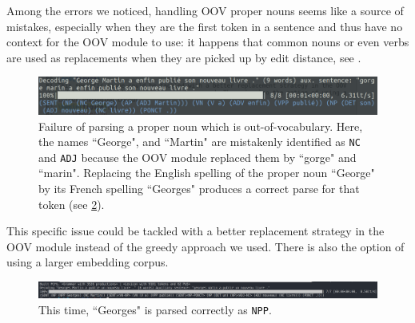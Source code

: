 \documentclass[11pt]{article}
\begin{document}
Among the errors we noticed, handling OOV proper nouns seems like a source of mistakes, especially when they are the first token in a sentence and thus have no context for the OOV module to use: it happens that common nouns or even verbs are used as replacements when they are picked up by edit distance, see .
\begin{figure}[ht!]
	\centering
	\includegraphics[width=\linewidth]{georgemartin-fail.png}
	\caption{Failure of parsing a proper noun which is out-of-vocabulary. Here, the names ``George", and ``Martin" are mistakenly identified as \lstinline|NC| and \lstinline|ADJ| because the OOV module replaced them by ``gorge" and ``marin". Replacing the English spelling of the proper noun ``George" by its French spelling ``Georges" produces a correct parse for that token (see \cref{fig:ParseWin_GeorgeRR}).}
	\label{fig:npParseFailure_GeorgeRR}
\end{figure}
This specific issue could be tackled with a better replacement strategy in the OOV module instead of the greedy approach we used. There is also the option of using a larger embedding corpus.
\begin{figure}[h]
	\centering
	\includegraphics[width=\linewidth]{../example-run.png}
	\caption{This time, ``Georges" is parsed correctly as \lstinline|NPP|.}\label{fig:ParseWin_GeorgeRR}
\end{figure}




\printbibliography{}
\end{document}

